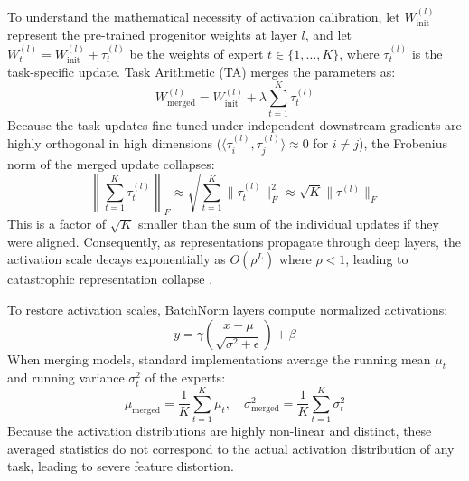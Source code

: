 \documentclass{article}
\theoremstyle{plain}
\theoremstyle{definition}
\theoremstyle{remark}
\begin{document}
To understand the mathematical necessity of activation calibration, let $W_{\text{init}}^{(l)}$ represent the pre-trained progenitor weights at layer $l$, and let $W_t^{(l)} = W_{\text{init}}^{(l)} + \tau_t^{(l)}$ be the weights of expert $t \in \{1, \dots, K\}$, where $\tau_t^{(l)}$ is the task-specific update. Task Arithmetic (TA) merges the parameters as:
\begin{equation}
  W_{\text{merged}}^{(l)} = W_{\text{init}}^{(l)} + \lambda \sum_{t=1}^K \tau_t^{(l)}
\end{equation}
Because the task updates fine-tuned under independent downstream gradients are highly orthogonal in high dimensions ($\langle \tau_i^{(l)}, \tau_j^{(l)} \rangle \approx 0$ for $i \neq j$), the Frobenius norm of the merged update collapses:
\begin{equation}
  \left\| \sum_{t=1}^K \tau_t^{(l)} \right\|_F \approx \sqrt{\sum_{t=1}^K \|\tau_t^{(l)}\|_F^2} \approx \sqrt{K} \|\tau^{(l)}\|_F
\end{equation}
This is a factor of $\sqrt{K}$ smaller than the sum of the individual updates if they were aligned. Consequently, as representations propagate through deep layers, the activation scale decays exponentially as $O(\rho^L)$ where $\rho < 1$, leading to catastrophic representation collapse \cite{jordan23}.

To restore activation scales, BatchNorm layers compute normalized activations:
\begin{equation}
  y = \gamma \left( \frac{x - \mu}{\sqrt{\sigma^2 + \epsilon}} \right) + \beta
\end{equation}
When merging models, standard implementations average the running mean $\mu_t$ and running variance $\sigma_t^2$ of the experts:
\begin{equation}
  \mu_{\text{merged}} = \frac{1}{K} \sum_{t=1}^K \mu_t, \quad \sigma_{\text{merged}}^2 = \frac{1}{K} \sum_{t=1}^K \sigma_t^2
\end{equation}
Because the activation distributions are highly non-linear and distinct, these averaged statistics do not correspond to the actual activation distribution of any task, leading to severe feature distortion.
\end{document}
